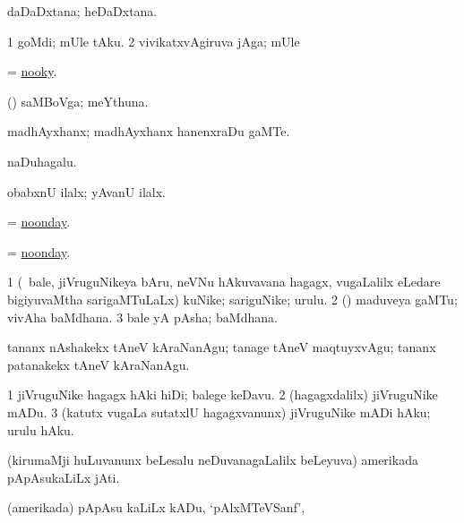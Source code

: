 \bentry
{}
\gl{\nA}
\bmng
daDaDxtana; heDaDxtana. 
\emng
\eentry

\bentry
{}
\gl{\nA}
\bmng
\bnum
\num{1} goMdi; mUle tAku. 
\num{2} vivikatxvAgiruva jAga; mUle 
\enum
\emng
\eentry

\bentry
{}
\gl{\nA}
\bmng
= \hyperlink{nooky}{nooky}. 
\emng
\eentry

\bentry
{}
\gl{\nA}
\bmng
(\ashi) saMBoVga; meYthuna. 
\emng
\eentry

\bentry
{}
\gl{\nA}
\bmng
madhAyxhanx; madhAyxhanx hanenxraDu gaMTe. 
\emng
\eentry

\bentry
{}
\gl{\nA}
\bmng
naDuhagalu. 
\emng
\eentry

\bentry
{}
\gl{\nA}
\bmng
obabxnU ilalx; yAvanU ilalx. 
\emng
\eentry

\bentry
{}
\gl{\nA}
\bmng
= \hyperlink{noonday}{noonday}. 
\emng
\eentry

\bentry
{}
\gl{\nA}
\bmng
= \hyperlink{noonday}{noonday}. 
\emng
\eentry

\bentry
{}
\gl{\nA}
\bmng
\bnum
\num{1} (\kanmu\ bale, jiVruguNikeya bAru, neVNu hAkuvavana hagagx, \mo vugaLalilx eLedare bigiyuvaMtha sarigaMTuLaLx)  kuNike; sariguNike; urulu.  
\num{2} (\hA) maduveya gaMTu; vivAha baMdhana. 
\num{3} bale yA pAsha; baMdhana. 
\enum
\emng

\noindent
\gl{\pagu}
\bmng
{} tananx nAshakekx tAneV kAraNanAgu; tanage tAneV maqtuyxvAgu; tananx patanakekx tAneV kAraNanAgu. 
\emng
\eentry

\bentry
{}
\gl{\sakirx}
\bmng
\bnum
\num{1} jiVruguNike hagagx hAki hiDi; balege keDavu. 
\num{2} (hagagxdalilx) jiVruguNike mADu. 
\num{3} (katutx \mo vugaLa sutatxlU hagagxvanunx) jiVruguNike mADi hAku; urulu hAku. 
\enum
\emng
\eentry

\bentry
{}
\gl{\nA}
\bmng
(kirumaMji huLuvanunx beLesalu neDuvanagaLalilx beLeyuva) amerikada pApAsukaLiLx jAti. 
\emng
\eentry

\bentry
{}
\gl{\nA}
\bmng
(amerikada) pApAsu kaLiLx kADu, `pAlxMTeVSanf', 
\emng
\eentry

